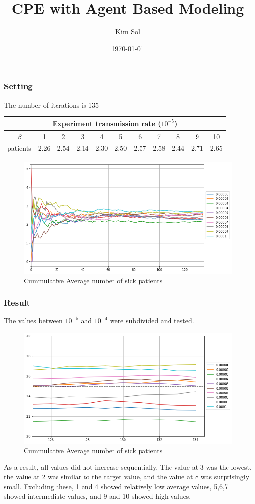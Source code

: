 \documentclass[aspectratio=169, 9pt, xcolor=table]{beamer}
\title{CPE with Agent Based Modeling}
\author{Kim Sol}
\institute{School of Mathematics and Computing}
\date{\today}
\begin{document}
\begin{frame}
    \titlepage
\end{frame}


\begin{frame}
    \frametitle{Setting}
    The number of iterations is 135
    \begin{center}
    \begin{tabular}{|c||c|c|c|c|c|c|c|c|c|c|}   
        \hline
        \multicolumn{11}{|c|}{Experiment transmission rate (\(10^{-5}\)) } \\
        \hline
        \(\beta\)& 1 & 2 & 3 & 4 & 5 & 6 & 7 & 8 & 9 & 10 \\
        \hline
        patients& 2.26  & 2.54 & 2.14 & 2.30 & 2.50 & 2.57 & 2.58 & 2.44 & 2.71 & 2.65 \\
        \hline
    \end{tabular}
    \end{center}


    \begin{figure}[H]
        \centering
        \includegraphics[width=.5\textwidth]{../result/calibration/pic/refinement.png} %
        \caption{Cummulative Average number of sick patients}
    \end{figure}
    
\end{frame}

\begin{frame}
    \frametitle{Result}
    The values between \(10^{-5}\) and \(10^{-4}\) were subdivided and tested. 
    \begin{figure}[H]
        \centering
        \includegraphics[width=.5\textwidth]{../result/calibration/pic/refinement_zoom.png} %
        \caption{Cummulative Average number of sick patients}
    \end{figure}
    As a result, all values did not increase sequentially. The value at 3 was the lowest, the value at 2 was similar to the target value, and the value at 8 was surprisingly small. Excluding these, 1 and 4 showed relatively low average values, 5,6,7 showed intermediate values, and 9 and 10 showed high values.
\end{frame}
\end{document}
